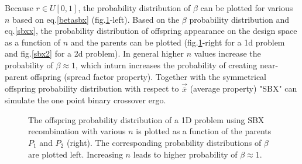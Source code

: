 \begin{itemize}
Because $r\in U[0,1]$, the probability distribution of $\beta$ can be plotted for various $n$ based on eq.\ref{betasbx} (fig.\ref{sbx}-left). Based on the $\beta$ probability distribution and eq.\ref{sbxx}, the probability distribution of offspring appearance on the design space as a function of $n$ and the parents can be plotted (fig.\ref{sbx}-right for a 1d problem and fig.\ref{sbx2} for a 2d problem). In general higher $n$ values increase the probability of $\beta \approx 1$, which inturn increases the probability of creating near-parent offspring (spread factor property). Together with the symmetrical offspring probability distribution with respect to $\vec{\overline{x}}$ (average property) "SBX" can simulate the one point binary crossover ergo.    

\begin{figure}[h!]
\begin{minipage}[b]{0.5\linewidth}
 \centering
\end{minipage}
\begin{minipage}[b]{0.5\linewidth}
 \centering
\end{minipage}
\caption{The offspring probability distribution of a 1D problem using SBX recombination with various $n$ is plotted as a function of the parents $P_1$ and $P_2$ (right). The corresponding probability distributions of $\beta$ are plotted left. Increasing $n$ leads to higher probability of $\beta \approx 1$.  }
\label{sbx}
\end{figure}


\end{itemize}
